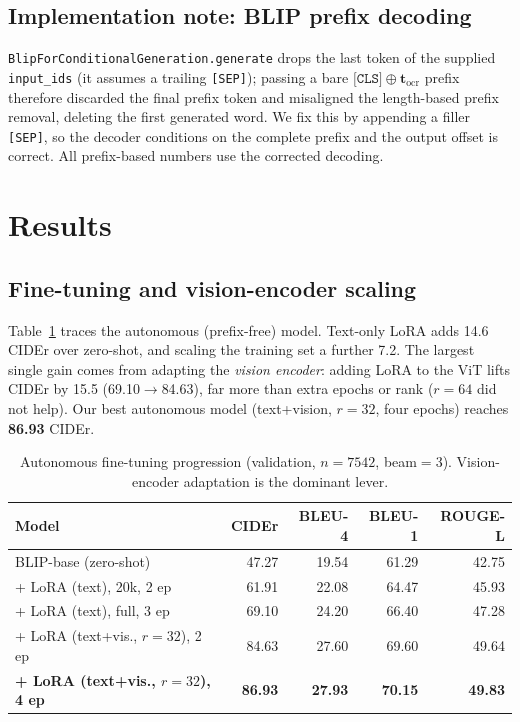 \subsection{Implementation note: BLIP prefix decoding}
\label{sec:note}
\texttt{BlipForConditionalGeneration.generate} drops the last token of the supplied
\texttt{input\_ids} (it assumes a trailing \texttt{[SEP]}); passing a bare
$\texttt{[CLS]}\oplus\mathbf{t}_{\text{ocr}}$ prefix therefore discarded the final
prefix token and misaligned the length-based prefix removal, deleting the first
generated word. We fix this by appending a filler \texttt{[SEP]}, so the decoder
conditions on the complete prefix and the output offset is correct. All
prefix-based numbers use the corrected decoding.


\section{Results}
\label{sec:results}

\subsection{Fine-tuning and vision-encoder scaling}
\label{sec:res:ft}
Table~\ref{tab:progression} traces the autonomous (prefix-free) model. Text-only
LoRA adds \num{+14.6} CIDEr over zero-shot, and scaling the training set a further
\num{+7.2}. The largest single gain comes from adapting the \emph{vision encoder}:
adding LoRA to the ViT lifts CIDEr by \num{+15.5} (\num{69.10}$\rightarrow$\num{84.63}),
far more than extra epochs or rank ($r{=}64$ did not help). Our best autonomous
model (text+vision, $r{=}32$, four epochs) reaches \textbf{\num{86.93}} CIDEr.

\begin{table}[t]
\centering
\caption{Autonomous fine-tuning progression (validation, $n{=}7542$, beam${=}3$).
Vision-encoder adaptation is the dominant lever.}
\label{tab:progression}
\begin{tabular}{lrrrr}
\toprule
Model & CIDEr & BLEU-4 & BLEU-1 & ROUGE-L \\
\midrule
BLIP-base (zero-shot)                 & 47.27 & 19.54 & 61.29 & 42.75 \\
\;+ LoRA (text), 20k, 2 ep            & 61.91 & 22.08 & 64.47 & 45.93 \\
\;+ LoRA (text), full, 3 ep           & 69.10 & 24.20 & 66.40 & 47.28 \\
\;+ LoRA (text+vis., $r{=}32$), 2 ep  & 84.63 & 27.60 & 69.60 & 49.64 \\
\textbf{\;+ LoRA (text+vis., $r{=}32$), 4 ep} & \textbf{86.93} & \textbf{27.93} & \textbf{70.15} & \textbf{49.83} \\
\bottomrule
\end{tabular}
\end{table}

